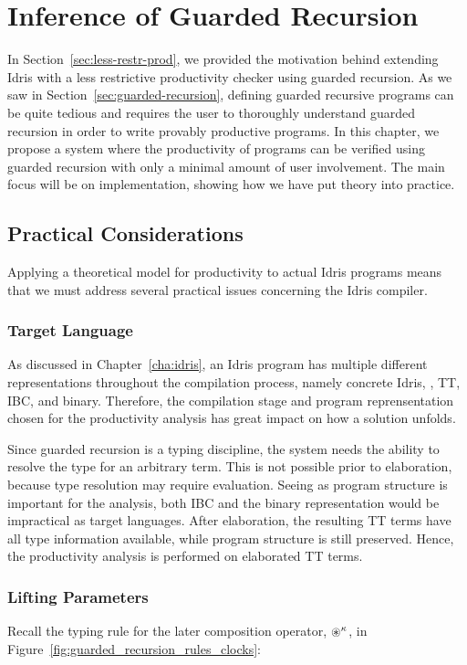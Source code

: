 \chapter{Inference of Guarded Recursion}
\label{cha:infer-guard-recurs}
In Section~\ref{sec:less-restr-prod}, we provided the motivation behind
extending Idris with a less restrictive productivity checker using guarded
recursion. As we saw in Section~\ref{sec:guarded-recursion}, defining guarded
recursive programs can be quite tedious and requires the user to thoroughly
understand guarded recursion in order to write provably productive programs. In
this chapter, we propose a system where the productivity of programs can be
verified using guarded recursion with only a minimal amount of user
involvement. The main focus will be on implementation, showing how we have put theory into practice.

\section{Practical Considerations}
Applying a theoretical model for productivity to actual Idris programs means
that we must address several practical issues concerning the Idris compiler.

\subsection{Target Language}
As discussed in Chapter~\ref{cha:idris}, an Idris program has multiple different
representations throughout the compilation process, namely concrete Idris,
\IdrisM{}, TT, IBC, and binary. Therefore, the compilation
stage and program reprensentation chosen for the productivity analysis has great
impact on how a solution unfolds.

Since guarded recursion is a typing discipline, the system needs the ability to
resolve the type for an arbitrary term. This is not possible prior to
elaboration, because type resolution may require evaluation. Seeing as program
structure is important for the analysis, both IBC and the binary representation
would be impractical as target languages. After elaboration, the resulting TT
terms have all type information available, while program structure is still
preserved. Hence, the productivity analysis is performed on elaborated TT terms.

\subsection{Lifting Parameters} %
\label{sec:handling-parameters}
Recall the typing rule for the later composition operator, $\circledast^\kappa$, in
Figure~\ref{fig:guarded_recursion_rules_clocks}:

